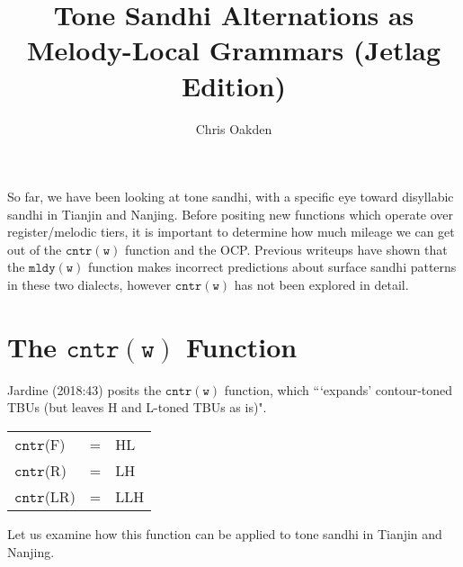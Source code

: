 \documentclass{article}
\title{Tone Sandhi Alternations as Melody-Local Grammars (Jetlag Edition)}
\author{Chris Oakden}
\begin{document}
\maketitle
So far, we have been looking at tone sandhi, with a specific eye toward disyllabic sandhi in Tianjin and Nanjing. Before positing new functions which operate over register/melodic tiers, it is important to determine how much mileage we can get out of the $\mathtt{cntr(w)}$ function and the OCP. Previous writeups have shown that the $\mathtt{mldy(w)}$ function makes incorrect predictions about surface sandhi patterns in these two dialects, however $\mathtt{cntr(w)}$ has not been explored in detail. 
\section{The $\mathtt{cntr(w)}$ Function}
Jardine (2018:43) posits the $\mathtt{cntr(w)}$ function, which ```expands' contour-toned TBUs (but leaves H and L-toned TBUs as is)".
\begin{exe}
\ex
\begin{tabular}[t]{lcl}
$\mathtt{cntr}$(F) & = & HL \\
$\mathtt{cntr}$(R) & = & LH \\
$\mathtt{cntr}$(LR) & = & LLH
\end{tabular}
\end{exe}
Let us examine how this function can be applied to tone sandhi in Tianjin and Nanjing.
\end{document}
